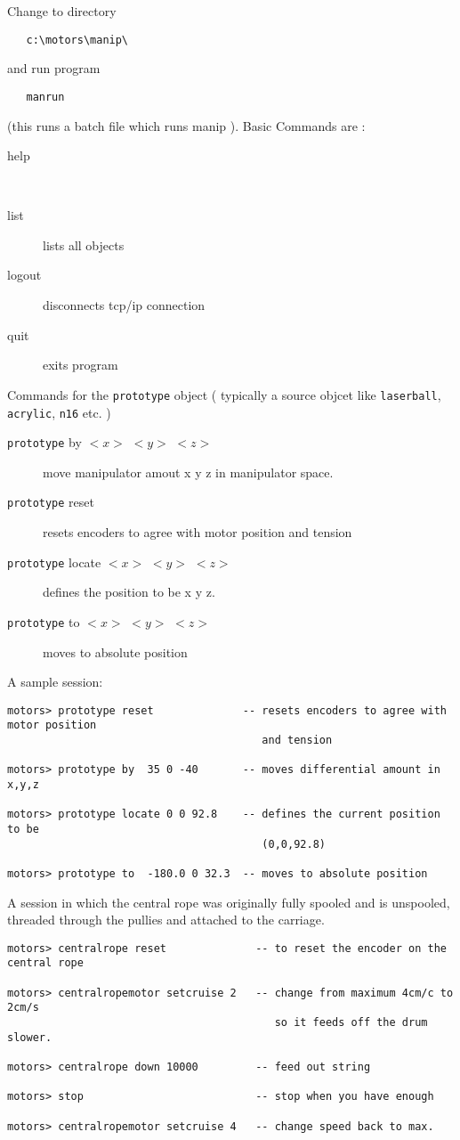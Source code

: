 Change to directory
\begin{verbatim}
   c:\motors\manip\
\end{verbatim}
and run program 
\begin{verbatim}
   manrun
\end{verbatim}
(this runs a batch file which runs manip ).  Basic Commands are :
\begin{description}
\item[help]~
\item[list] lists all objects
\item[logout] disconnects tcp/ip connection
\item[quit] exits program
\end{description}
Commands for the {\tt prototype} object ( typically a source objcet like {\tt laserball}, {\tt acrylic}, {\tt n16} etc. ) 
\begin{description}
\item[{\tt prototype} by $<x>$ $<y>$ $<z>$] move manipulator amout x y z in 
  manipulator space.
\item[{\tt prototype} reset] resets encoders to agree with motor position and tension
\item[{\tt prototype} locate $<x>$ $<y>$ $<z>$] defines the position to be x y z.
\item[{\tt prototype} to $<x>$ $<y>$ $<z>$] moves to absolute position
\end{description}
A sample session:
\begin{verbatim}
motors> prototype reset              -- resets encoders to agree with motor position
                                        and tension

motors> prototype by  35 0 -40       -- moves differential amount in x,y,z

motors> prototype locate 0 0 92.8    -- defines the current position to be
                                        (0,0,92.8)
  
motors> prototype to  -180.0 0 32.3  -- moves to absolute position
\end{verbatim}
  

A session in which the central rope was originally fully spooled and is
unspooled, threaded through the pullies and attached to the carriage.
\begin{verbatim}
motors> centralrope reset              -- to reset the encoder on the central rope
  
motors> centralropemotor setcruise 2   -- change from maximum 4cm/c to 2cm/s
                                          so it feeds off the drum slower.
  
motors> centralrope down 10000         -- feed out string
  
motors> stop                           -- stop when you have enough
  
motors> centralropemotor setcruise 4   -- change speed back to max.
\end{verbatim}  
  
